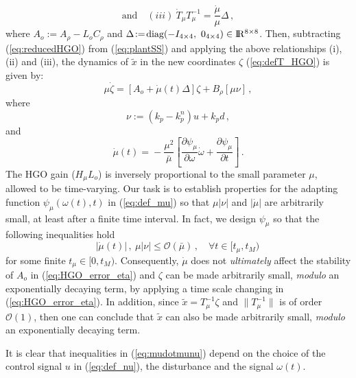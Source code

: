 \documentclass[letterpaper, 10 pt, conference]{ieeeconf}  %
\def\re{{\rm I}\! {\rm R}}
\theoremstyle{plain}
\theoremstyle{definition}
\theoremstyle{remark}
\begin{document}
\begin{footnotesize}
			$$\mbox{and} \quad
			(iii) \ \dot{T}_\mu T_\mu^{-1}\!=\!\frac{\dot{\mu}}{\mu}
			\Delta\,,$$
			where $A_o\!:=\!A_\rho\!-\!L_o C_\rho$ and
			$\Delta\!:=\!\mbox{diag}(-I_{4 \times 4}, \ 0_{4 \times 4}) \in \re^{8 \times 8}$.
			Then, subtracting (\ref{eq:reducedHGO}) from
			(\ref{eq:plantSS}) and applying the above
			relationships (i),
			(ii) and (iii), the dynamics of $\tilde{x}$ 
			in the new coordinates $\zeta$ (\ref{eq:defT_HGO}) is given by:
			\begin{equation}
			\mu \dot{\zeta} = [A_o+ \dot{\mu}(t) \Delta] \zeta + B_\rho [\mu
			\nu]\,, \label{eq:HGO_error_eta}
			\end{equation}
			where %
			\begin{equation}
			\nu:=(k_p-k_p^n)u+k_p d\,,\label{eq:def_nu}
			\end{equation}
			and
			\begin{equation}
			\dot{\mu}(t)\!=\!-\frac{\mu^2}{\bar{\mu}} \left[\frac{\partial
			\psi_\mu}{\partial \omega} \dot{\omega}+\frac{\partial
			\psi_\mu}{\partial t}\right]\,. \label{eq:def_mudot}
			\end{equation}
			The HGO gain ($H_\mu L_o$) is inversely proportional to the small parameter $\mu$,
			allowed to be time-varying. %
			Our task is to establish properties for the adapting
			function $\psi_\mu(\omega(t),t)$ in (\ref{eq:def_mu}) so that $\mu
			|\nu|$ and $|\dot{\mu}|$ are arbitrarily small, at least after a
			finite time interval. In fact, we design $\psi_\mu$ so that the following inequalities hold
			\begin{equation}
			|\dot{\mu}(t)|\,, \ \mu |\nu| \leq \mathcal{O}(\bar{\mu})\,, \quad
			\forall t \in [t_\mu,t_M)\, \label{eq:mudotmunu}
			\end{equation}
			for  some finite $t_\mu \in [0,t_M)$.  Consequently, $\dot{\mu}$ does not {\em
			ultimately} affect the stability of $A_o$ in
			(\ref{eq:HGO_error_eta}) and $\zeta$  can be made
			arbitrarily small, {\em modulo} an exponentially decaying term, by applying a time scale changing in (\ref{eq:HGO_error_eta}). In addition, since $\tilde{x} = T_\mu^{-1} \zeta$ and $\|T_\mu^{-1}\|$ is of order $\mathcal{O}(1)$, then one can conclude that $\tilde{x}$ can also be made
			arbitrarily small, {\em modulo} an exponentially decaying term.

			It is clear that inequalities in (\ref{eq:mudotmunu}) depend on the choice of the control signal $u$ in (\ref{eq:def_nu}), the disturbance and the signal $\omega(t)$. 


\end{footnotesize}
\end{document}
